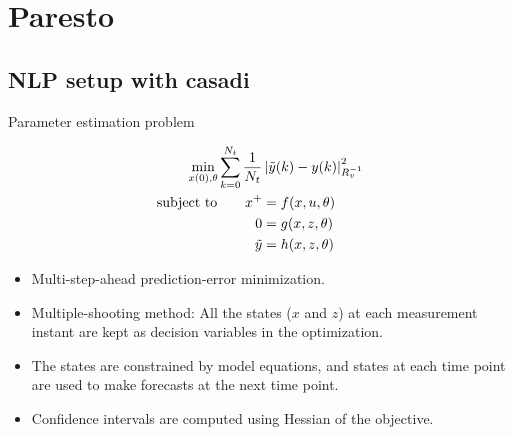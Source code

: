 \documentclass[xcolor=dvipsnames, 8pt]{beamer} %
\newcommand{\norm}[1]{\left| #1 \right|}
\begin{document}
\section{Paresto}

\subsection{NLP setup with casadi}

\begin{frame}{Parameter estimation problem}

\begin{align*}
\underset{x(0), \theta}{\textnormal{min}} \sum_{k=0}^{N_t} 
\dfrac{1}{N_t} &\norm{\tilde{y}(k) - y(k)}^2_{R_v^{-1}}  \\
\textnormal{subject to} \quad \quad x^{+} &= f(x, u, \theta) \\
0 &= g(x, z, \theta) \\
\tilde{y} &= h(x, z, \theta)
\end{align*}

\begin{itemize}
	\setlength{\itemsep}{10pt}%
	\item Multi-step-ahead prediction-error minimization. 
	\item Multiple-shooting method: All the states ($x$ and $z$) 
	at each measurement instant are kept as decision variables in the 
	optimization. 
	\item The states are constrained by model equations, and states at each 
	time point are used to make forecasts at the next time point. 
	\item Confidence intervals are computed using Hessian of the objective. 
\end{itemize}
\end{frame}
\end{document}
